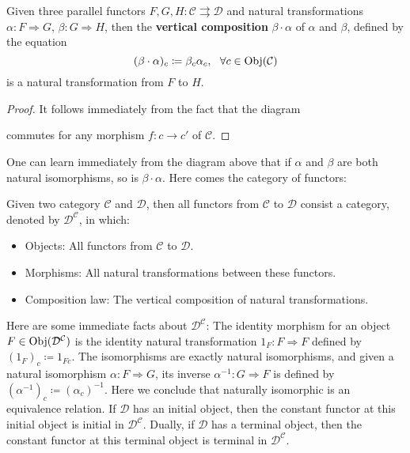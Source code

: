 	\begin{lemma}
	Given three parallel functors $F,G,H:\mathcal{C}\rightrightarrows \mathcal{D}$ and natural transformations $\alpha:F\Rightarrow G$, $\beta:G\Rightarrow H$, then the \textbf{vertical composition} $\beta\cdot\alpha$ of $\alpha$ and $\beta$, defined by the equation
	\[(\beta\cdot\alpha)_c\coloneqq \beta_c\alpha_c,\ \ \forall c\in\Obj(\mathcal{C})\]
	is a natural transformation from $F$ to $H$. 
	\end{lemma}
	\begin{proof}
	It follows immediately from the fact that the diagram
		\begin{center}
		\end{center}
		commutes for any morphism $f:c\to c'$ of $\mathcal{C}$.
	\end{proof}
	One can learn immediately from the diagram above that if $\alpha$ and $\beta$ are both natural isomorphisms, so is $\beta\cdot \alpha$. Here comes the category of functors:
	\begin{definition}
	Given two category $\mathcal{C}$ and $\mathcal{D}$, then all functors from $\mathcal{C}$ to $\mathcal{D}$ consist a category, denoted by $\mathcal{D}^\mathcal{C}$, in which:
		\begin{itemize}
			\item Objects: All functors 	from $\mathcal{C}$ to $\mathcal{D}$.
			\item Morphisms: All natural transformations between these functors.
			\item Composition law: The vertical composition of natural transformations.
		\end{itemize}
	\end{definition}
	Here are some immediate facts about $\mathcal{D}^\mathcal{C}$: The identity morphism for an object $F\in\operatorname{Obj}(\mathcal{D}^\mathcal{C})$ is the identity natural transformation $1_F:F\Rightarrow F$  defined by $(1_F)_c\coloneqq 1_{Fc}$. The isomorphisms are exactly natural isomorphisms, and given a natural isomorphism $\alpha:F\Rightarrow G$, its inverse $\alpha^{-1}:G\Rightarrow F$ is defined by $(\alpha^{-1})_c\coloneqq (\alpha_c)^{-1}$. Here we conclude that naturally isomorphic is an equivalence relation. If $\mathcal{D}$ has an initial object, then the constant functor at this initial object is initial in $\mathcal{D}^\mathcal{C}$. Dually, if $\mathcal{D}$ has a terminal object, then the constant functor at this terminal object is terminal in $\mathcal{D}^\mathcal{C}$.
